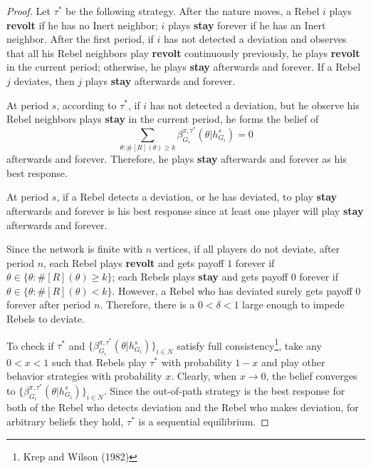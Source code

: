 \documentclass[12pt,letter]{article}
\newtheorem*{lemma*}{Lemma}
\theoremstyle{definition}
\theoremstyle{remark}
\theoremstyle{claim}
\begin{document}
\begin{proof}
Let $\tau^{*}$ be the following strategy. After the nature moves, a Rebel $i$ plays \textbf{revolt} if he has no Inert neighbor; $i$ plays \textbf{stay} forever if he has an Inert neighbor. After the first period, if $i$ has not detected a deviation and observes that all his Rebel neighbors play \textbf{revolt} continuously previously, he plays \textbf{revolt} in the current period; otherwise, he plays \textbf{stay} afterwards and forever. If a Rebel $j$ deviates, then $j$ plays \textbf{stay} afterwards and forever.

At period $s$, according to $\tau^{*}$, if $i$ has not detected a deviation, but he observe his Rebel neighbors plays \textbf{stay} in the current period, he forms the belief of \[\sum_{\theta:\#[R](\theta)\geq k}\beta^{\pi,\tau^*}_{G_i}(\theta|h^{s}_{G_i})=0\] afterwards and forever. Therefore, he plays \textbf{stay} afterwards and forever as his best response. 

At period $s$, if a Rebel detects a deviation, or he has deviated, to play \textbf{stay} afterwards and forever is his best response since at least one player will play \textbf{stay} afterwards and forever. 

Since the network is finite with $n$ vertices, if all players do not deviate, after period $n$, each Rebel plays \textbf{revolt} and gets payoff $1$ forever if $\theta\in \{\theta: \#[R](\theta)\geq k\}$; each Rebels plays \textbf{stay} and gets payoff $0$ forever if $\theta\in \{\theta: \#[R](\theta)< k\}$. However, a Rebel who has deviated surely gets payoff $0$ forever after period $n$. Therefore, there is a $0<\delta<1$ large enough to impede Rebels to deviate.

To check if $\tau^{*}$ and $\{\beta^{\pi,\tau^*}_{G_i}(\theta|h^{s}_{G_i})\}_{i\in N}$ satisfy full consistency\footnote{Krep and Wilson (1982)}, take any $0<x<1$ such that Rebels play $\tau^{*}$ with probability $1-x$ and play other behavior strategies with probability $x$. Clearly, when $x \rightarrow 0$, the belief converges to $\{\beta^{\pi,\tau^*}_{G_i}(\theta|h^{s}_{G_i})\}_{i\in N}$. Since the out-of-path strategy is the best response for both of the Rebel who detects deviation and the Rebel who makes deviation, for arbitrary beliefs they hold, $\tau^{*}$ is a sequential equilibrium.
\end{proof}
%
%
\end{document}
